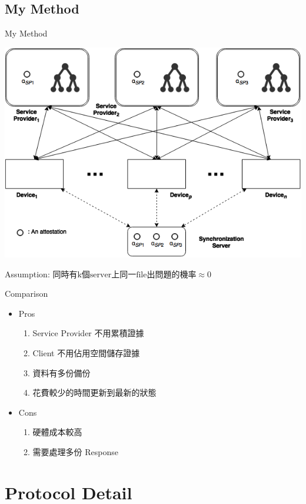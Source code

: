 \documentclass{beamer}
\begin{document}
\begin{CJK}{UTF8}{bkai}
\subsection{\small{My Method}}
\begin{frame}{My Method}
	\begin{center}
	\includegraphics[width=.8\textwidth]{wei_chih.png}
	\end{center}
	\color{blue} Assumption: $\text{同時有k個server上同一file出問題的機率} \approx 0$
\end{frame}

\begin{frame}{Comparison}
	\begin{itemize}
		\item Pros
			\begin{enumerate}
				\item Service Provider 不用累積證據
				\item Client 不用佔用空間儲存證據
				\item 資料有多份備份
				\item 花費較少的時間更新到最新的狀態
			\end{enumerate}
		\item Cons
			\begin{enumerate}
				\item 硬體成本較高
				\item 需要處理多份 Response
			\end{enumerate}
	\end{itemize}
\end{frame}

\section{Protocol Detail}

\end{CJK}
\end{document}
